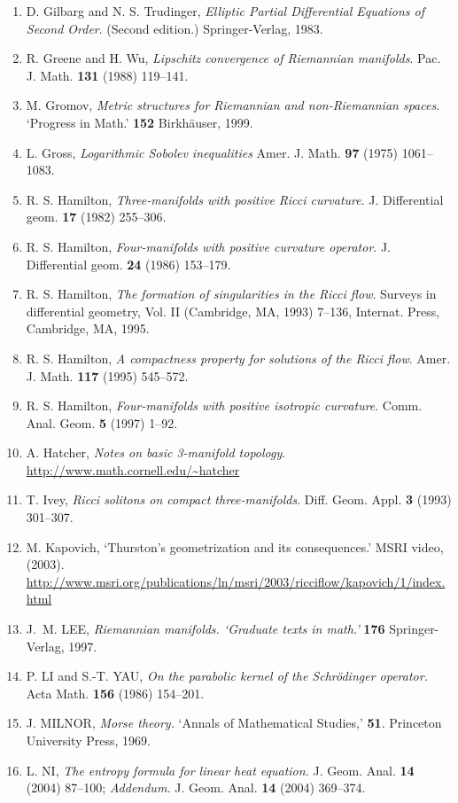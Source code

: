 \begin{enumerate}
\item D. Gilbarg and N. S. Trudinger, \emph{Elliptic Partial Differential Equations of Second Order}. (Second edition.) Springer-Verlag, 1983.
\item R. Greene and H. Wu, \emph{Lipschitz convergence of Riemannian manifolds}. Pac. J. Math. \textbf{131} (1988) 119--141.
\item M. Gromov, \emph{Metric structures for Riemannian and non-Riemannian spaces}. `Progress in Math.' \textbf{152} Birkhäuser, 1999.
\item L. Gross, \emph{Logarithmic Sobolev inequalities} Amer. J. Math. \textbf{97} (1975) 1061--1083.
\item R. S. Hamilton, \emph{Three-manifolds with positive Ricci curvature}. J. Differential geom. \textbf{17} (1982) 255--306.
\item R. S. Hamilton, \emph{Four-manifolds with positive curvature operator}. J. Differential geom. \textbf{24} (1986) 153--179.
\item R. S. Hamilton, \emph{The formation of singularities in the Ricci flow}. Surveys in differential geometry, Vol. II (Cambridge, MA, 1993) 7--136, Internat. Press, Cambridge, MA, 1995.
\item R. S. Hamilton, \emph{A compactness property for solutions of the Ricci flow}. Amer. J. Math. \textbf{117} (1995) 545--572.
\item R. S. Hamilton, \emph{Four-manifolds with positive isotropic curvature}. Comm. Anal. Geom. \textbf{5} (1997) 1--92.
\item A. Hatcher, \emph{Notes on basic 3-manifold topology}. \url{http://www.math.cornell.edu/~hatcher}
\item T. Ivey, \emph{Ricci solitons on compact three-manifolds}. Diff. Geom. Appl. \textbf{3} (1993) 301--307.
\item M. Kapovich, `Thurston's geometrization and its consequences.' MSRI video, (2003). \url{http://www.msri.org/publications/ln/msri/2003/ricciflow/kapovich/1/index.html}
\item J.~M. LEE, \emph{Riemannian manifolds. `Graduate texts in math.'} \textbf{176} Springer-Verlag, 1997.
\item P. LI and S.-T. YAU, \emph{On the parabolic kernel of the Schr\"odinger operator.} Acta Math. \textbf{156} (1986) 154--201.
\item J. MILNOR, \emph{Morse theory.} `Annals of Mathematical Studies,' \textbf{51}. Princeton University Press, 1969.
\item L. NI, \emph{The entropy formula for linear heat equation.} J. Geom. Anal. \textbf{14} (2004) 87--100; \emph{Addendum.} J. Geom. Anal. \textbf{14} (2004) 369--374.

\end{enumerate}
